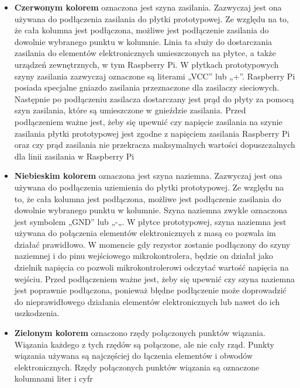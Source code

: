 \begin{itemize}  
	\item \textbf{Czerwonym kolorem} oznaczona jest szyna zasilania. Zazwyczaj jest ona używana do podłączenia zasilania do płytki prototypowej. Ze względu na to, że cała kolumna jest podłączona, możliwe jest podłączenie zasilania do dowolnie wybranego punktu w kolumnie. Linia ta służy do dostarczania zasilania do elementów elektronicznych umieszczonych na płytce, a także urządzeń zewnętrznych, w tym Raspberry Pi. W płytkach prototypowych szyny zasilania zazwyczaj oznaczone są literami „VCC” lub „+”. Raspberry Pi posiada specjalne gniazdo zasilania przeznaczone dla zasilaczy sieciowych. Następnie po podłączeniu zasilacza dostarczany jest prąd do płyty za pomocą szyn zasilania, które są umieszczone w gnieździe zasilania. Przed podłączeniem ważne jest, żeby się upewnić czy napięcie zasilania na szynie zasilania płytki prototypowej jest zgodne z napięciem zasilania Raspberry Pi oraz czy prąd zasilania nie przekracza maksymalnych wartości dopuszczalnych dla linii zasilania w Raspberry Pi
	\\
	\item \textbf{Niebieskim kolorem} oznaczona jest szyna naziemna. Zazwyczaj jest ona używana do podłączenia uziemienia do płytki prototypowej. Ze względu na to, że cała kolumna jest podłączona, możliwe jest podłączenie zasilania do dowolnie wybranego punktu w kolumnie. Szyna naziemna zwykle oznaczona jest symbolem „GND” lub „-„. W płytce prototypowej, szyna naziemna jest używana do połączenia elementów elektronicznych z masą co pozwala im działać prawidłowo. W momencie gdy rezystor zostanie podłączony do szyny naziemnej i do pinu wejściowego mikrokontrolera, będzie on działał jako dzielnik napięcia co pozwoli mikrokontrolerowi odczytać wartość napięcia na wejściu. Przed podłączeniem ważne jest, żeby się upewnić czy szyna naziemna jest poprawnie podłączona, ponieważ błędne podłączenie może doprowadzić do nieprawidłowego działania elementów elektronicznych lub nawet do ich uszkodzenia.
	\\
\item \textbf{Zielonym kolorem} oznaczono rzędy połączonych punktów wiązania. Wiązania każdego z tych rzędów są połączone, ale nie cały rząd. Punkty wiązania używana są najczęściej do łączenia elementów i obwodów elektronicznych. Rzędy połączonych punktów wiązania są oznaczone kolumnami liter i cyfr
	\\

\end{itemize}

